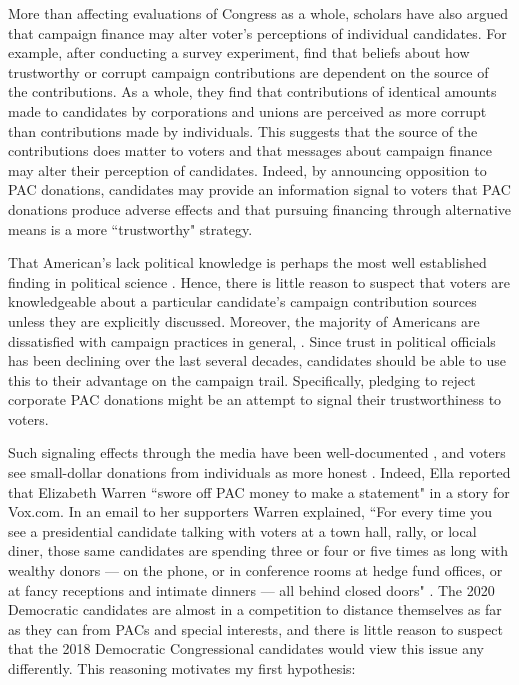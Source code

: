 \documentclass[12pt]{article}
\begin{document}
 More than affecting evaluations of Congress as a whole, scholars have also argued that campaign finance may alter voter's perceptions of individual candidates. For example, after conducting a survey experiment, \citet{bowler2016} find that beliefs about how trustworthy or corrupt campaign contributions are dependent on the source of the contributions. As a whole, they find that contributions of identical amounts made to candidates by corporations and unions are perceived as more corrupt than contributions made by individuals. This suggests that the source of the contributions does matter to voters and that messages about campaign finance may alter their perception of candidates. Indeed, by announcing opposition to PAC donations, candidates may provide an information signal to voters that PAC donations produce adverse effects and that pursuing financing through alternative means is a more ``trustworthy" strategy.
 
 That American's lack political knowledge is perhaps the most well established finding in political science \citep{page1992, carpini1997}. Hence, there is little reason to suspect that voters are knowledgeable about a particular candidate's campaign contribution sources unless they are explicitly discussed. Moreover, the majority of Americans are dissatisfied with campaign practices in general, \citep{mayer2001, persily2004}. Since trust in political officials has been declining over the last several decades, candidates should be able to use this to their advantage on the campaign trail. Specifically, pledging to reject corporate PAC donations might be an attempt to signal their trustworthiness to voters. 
 
 Such signaling effects through the media have been well-documented \citep{iyengar1989}, and voters see small-dollar donations from individuals as more honest \citep{bowler2016}. Indeed, Ella \citet{nilsen2019} reported that Elizabeth Warren ``swore off PAC money to make a statement" in a story for Vox.com. In an email to her supporters Warren explained, ``For every time you see a presidential candidate talking with voters at a town hall, rally, or local diner, those same candidates are spending three or four or five times as long with wealthy donors — on the phone, or in conference rooms at hedge fund offices, or at fancy receptions and intimate dinners — all behind closed doors" \citep{nilsen2019}. The 2020 Democratic candidates are almost in a competition to distance themselves as far as they can from PACs and special interests, and there is little reason to suspect that the 2018 Democratic Congressional candidates would view this issue any differently. This reasoning motivates my first hypothesis:  
 
\end{document}
